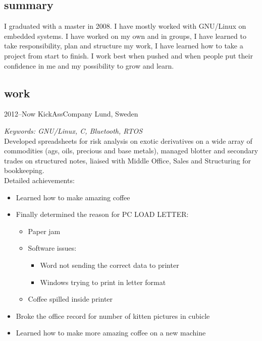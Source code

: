 \documentclass[nocolors]{template/friggeri-cv-a4}
\begin{document}
\subsection{summary}

I graduated with a master in 2008. I have mostly worked with GNU/Linux on embedded systems. I have worked on my own and in groups, I have learned to take responsibility, plan and structure my work, I have learned how to take a project from start to finish. I work best when pushed and when people put their confidence in me and my possibility to grow and learn.

\subsection{work}

\begin{entrylist}


\entry
{2012--Now}
{KickAssCompany}
{Lund, Sweden}
{\emph{Keywords: GNU/Linux, C, Bluetooth, RTOS} \\
Developed spreadsheets for risk analysis on exotic derivatives on a wide array of commodities (ags, oils, precious and base metals), managed blotter and secondary trades on structured notes, liaised with Middle Office, Sales and Structuring for bookkeeping. \\
Detailed achievements:
\begin{itemize}
\item Learned how to make amazing coffee
\item Finally determined the reason for \textsc{PC LOAD LETTER}:
\begin{itemize}
\item Paper jam
\item Software issues:
\begin{itemize}
\item Word not sending the correct data to printer
\item Windows trying to print in letter format
\end{itemize}
\item Coffee spilled inside printer
\end{itemize}
\item Broke the office record for number of kitten pictures in cubicle
\item Learned how to make more amazing coffee on a new machine
\end{itemize}}


\end{entrylist}
\end{document}
